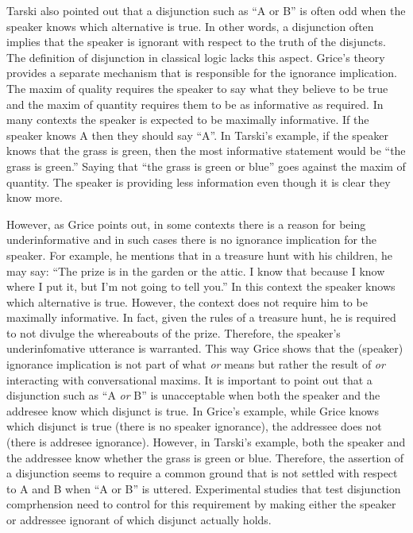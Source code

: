 \documentclass[oneside]{report}
\theoremstyle{definition}
\theoremstyle{definition}
\theoremstyle{definition}
\theoremstyle{remark}
\begin{document}
Tarski also pointed out that a disjunction such as ``A or B'' is often
odd when the speaker knows which alternative is true. In other words, a
disjunction often implies that the speaker is ignorant with respect to
the truth of the disjuncts. The definition of disjunction in classical
logic lacks this aspect. Grice's theory provides a separate mechanism
that is responsible for the ignorance implication. The maxim of quality
requires the speaker to say what they believe to be true and the maxim
of quantity requires them to be as informative as required. In many
contexts the speaker is expected to be maximally informative. If the
speaker knows A then they should say ``A''. In Tarski's example, if the
speaker knows that the grass is green, then the most informative
statement would be ``the grass is green.'' Saying that ``the grass is
green or blue'' goes against the maxim of quantity. The speaker is
providing less information even though it is clear they know more.

However, as Grice points out, in some contexts there is a reason for
being underinformative and in such cases there is no ignorance
implication for the speaker. For example, he mentions that in a treasure
hunt with his children, he may say: ``The prize is in the garden or the
attic. I know that because I know where I put it, but I'm not going to
tell you.'' In this context the speaker knows which alternative is true.
However, the context does not require him to be maximally informative.
In fact, given the rules of a treasure hunt, he is required to not
divulge the whereabouts of the prize. Therefore, the speaker's
underinfomative utterance is warranted. This way Grice shows that the
(speaker) ignorance implication is not part of what \emph{or} means but
rather the result of \emph{or} interacting with conversational maxims.
It is important to point out that a disjunction such as ``A \emph{or}
B'' is unacceptable when both the speaker and the addresee know which
disjunct is true. In Grice's example, while Grice knows which disjunct
is true (there is no speaker ignorance), the addressee does not (there
is addresee ignorance). However, in Tarski's example, both the speaker
and the addressee know whether the grass is green or blue. Therefore,
the assertion of a disjunction seems to require a common ground that is
not settled with respect to A and B when ``A or B'' is uttered.
Experimental studies that test disjunction comprhension need to control
for this requirement by making either the speaker or addressee ignorant
of which disjunct actually holds.
\end{document}
